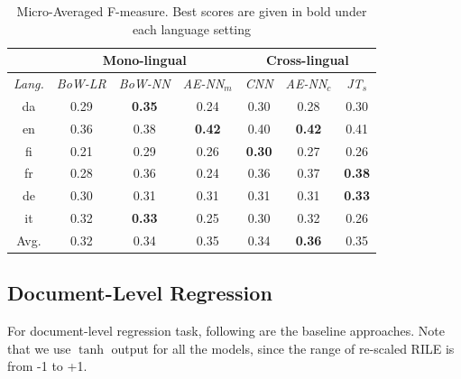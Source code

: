 \documentclass[11pt,a4paper]{article}
\begin{document}
 \begin{table}[!htp]
  \centering
  \begin{tabular}{ c@{\hskip 0.2in} c c c@{\hskip 0.25in} c c c}
  \toprule
   &  \multicolumn{3}{c}{Mono-lingual} & \multicolumn{3}{c}{Cross-lingual} \\
  \toprule
    \em{Lang.} & \em{BoW-LR} & \em{BoW-NN} & \em{AE-NN}$_{m}$ & \em{CNN} & \em{AE-NN}$_{c}$ & \em{JT}$_{s}$\\
    \midrule
    da  & 	0.29 & \textbf{0.35} & 0.24 & 0.30 & 0.28 & 0.30\\
    en   &  0.36 & 0.38 & \textbf{0.42} & 0.40 & \textbf{0.42} & 0.41\\    	
    fi  &   0.21 & 0.29 & 0.26 & \textbf{0.30} & 0.27 & 0.26\\
    fr    & 0.28 & 0.36 & 0.24 & 0.36 & 0.37 & \textbf{0.38} \\
    de    &  0.30 & 0.31 & 0.31 & 0.31 & 0.31 & \textbf{0.33}\\
    it    & 0.32 & \textbf{0.33} & 0.25 & 0.30 & 0.32 & 0.26\\
\midrule
Avg.    & 0.32 & 0.34 & 0.35 & 0.34 & \textbf{0.36} & 0.35\\

 \bottomrule

  \end{tabular}
  \caption{Micro-Averaged F-measure. Best scores are given in bold under each language setting}
  \label{tab:alx}
\end{table}

\subsection{Document-Level Regression}
For document-level regression task, following are the baseline approaches. Note that we use $\tanh$ output for all the models, since the range of re-scaled RILE is from -1 to +1.
\end{document}
